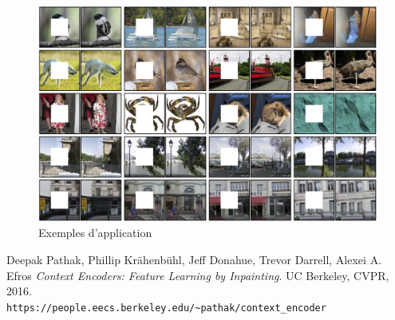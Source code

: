 \documentclass[11pt,a4paper]{article}
\begin{document}
            \begin{figure}[H]
                \centering
                \includegraphics[scale=0.2]{teaser.jpg} 
                \caption{Exemples d'application}
            \end{figure}



    \newpage
    \listoffigures
    \newpage



    \begin{thebibliography}{9}
        Deepak Pathak, Phillip Krähenbühl, Jeff Donahue, Trevor Darrell, Alexei A. Efros
        \textit{Context Encoders: Feature Learning by Inpainting}. 
        UC Berkeley, CVPR, 2016.
        \\\texttt{https://people.eecs.berkeley.edu/\~{}pathak/context\_encoder}
    \end{thebibliography}
\end{document}
